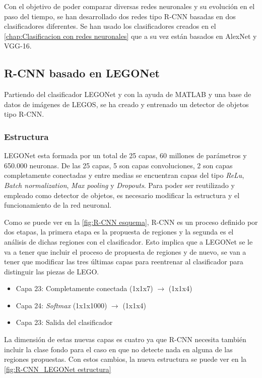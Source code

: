 Con el objetivo de poder comparar diversas redes neuronales y su evolución en el paso del tiempo, se han desarrollado dos redes tipo R-CNN basadas en dos clasificadores diferentes. Se han usado los clasificadores creados en el \autoref{chap:Clasificacion con redes neuronales} que a su vez están basados en AlexNet y VGG-16.

\subsection{R-CNN basado en LEGONet}
Partiendo del clasificador LEGONet y con la ayuda de MATLAB y una base de datos de imágenes de LEGOS, se ha creado y entrenado un detector de objetos tipo R-CNN.

\subsubsection*{Estructura}
LEGONet esta formada por un total de 25 capas, 60 millones de parámetros y 650.000 neuronas. De las 25 capas, 5 son capas convoluciones, 2 son capas completamente conectadas y entre medias se encuentran capas del tipo \textit{ReLu}, \textit{Batch normalization}, \textit{Max pooling} y \textit{Dropouts}. Para poder ser reutilizado y empleado como detector de objetos, es necesario modificar la estructura y el funcionamiento de la red neuronal.

Como se puede ver en la \autoref{fig:R-CNN esquema}, R-CNN es un proceso definido por dos etapas, la primera etapa es la propuesta de regiones y la segunda es el análisis de dichas regiones con el clasificador. Esto implica que a LEGONet se le va a tener que incluir el proceso de propuesta de regiones y de nuevo, se van a tener que modificar las tres últimas capas para reentrenar al clasificador para distinguir las piezas de LEGO.

\begin{itemize}
\item Capa 23: Completamente conectada (1x1x7) $\rightarrow$ (1x1x4)
\item Capa 24: \textit{Softmax} (1x1x1000) $\rightarrow$ (1x1x4)
\item Capa 23: Salida del clasificador
\end{itemize}

La dimensión de estas nuevas capas es cuatro ya que R-CNN necesita también incluir la clase fondo para el caso en que no detecte nada en alguna de las regiones propuestas. Con estos cambios, la nueva estructura se puede ver en la \autoref{fig:R-CNN_LEGONet estructura}

